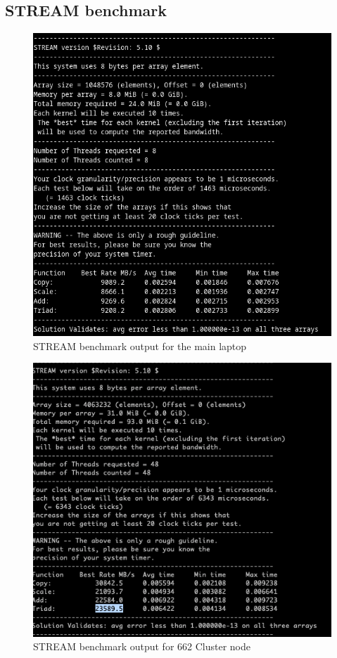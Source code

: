 \documentclass{article}
\begin{document}
\begin{appendices}
\subsection{STREAM benchmark}
\label{stream_bench}
\begin{figure}[H]
    \centering
    \includegraphics[scale=0.3]{Pictures/StreamBench_AsusS410UN.png}
    \caption{STREAM benchmark output for the main laptop}
\end{figure}

\begin{figure}[H]
    \centering
    \includegraphics[scale=0.35]{Pictures/StreamBench_Node662.png}
    \caption{STREAM benchmark output for 662 Cluster node}
\end{figure}


\end{appendices}
\end{document}
